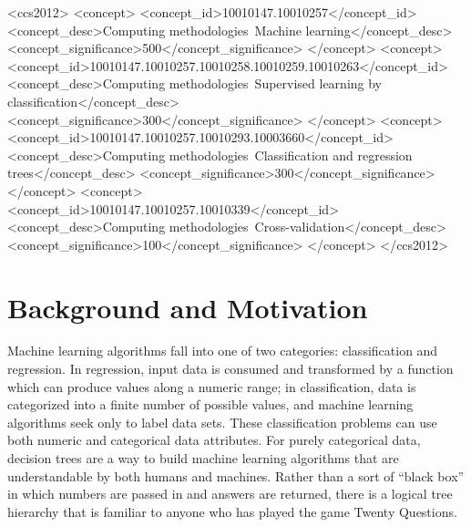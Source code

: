 \documentclass[screen, authorversion, nonacm, sigconf]{acmart}
\begin{document}
\begin{CCSXML}
  <ccs2012>
  <concept>
  <concept_id>10010147.10010257</concept_id>
  <concept_desc>Computing methodologies~Machine learning</concept_desc>
  <concept_significance>500</concept_significance>
  </concept>
  <concept>
  <concept_id>10010147.10010257.10010258.10010259.10010263</concept_id>
  <concept_desc>Computing methodologies~Supervised learning by classification</concept_desc>
  <concept_significance>300</concept_significance>
  </concept>
  <concept>
  <concept_id>10010147.10010257.10010293.10003660</concept_id>
  <concept_desc>Computing methodologies~Classification and regression trees</concept_desc>
  <concept_significance>300</concept_significance>
  </concept>
  <concept>
  <concept_id>10010147.10010257.10010339</concept_id>
  <concept_desc>Computing methodologies~Cross-validation</concept_desc>
  <concept_significance>100</concept_significance>
  </concept>
  </ccs2012>
\end{CCSXML}



\maketitle

\section{Background and Motivation}

Machine learning algorithms fall into one of two categories: classification and regression. In regression, input data is consumed and transformed by a function which can produce values along a numeric range; in classification, data is categorized into a finite number of possible values, and machine learning algorithms seek only to label data sets. These classification problems can use both numeric and categorical data attributes. For purely categorical data, decision trees are a way to build machine learning algorithms that are understandable by both humans and machines. Rather than a sort of ``black box'' in which numbers are passed in and answers are returned, there is a logical tree hierarchy that is familiar to anyone who has played the game Twenty Questions.
\end{document}
